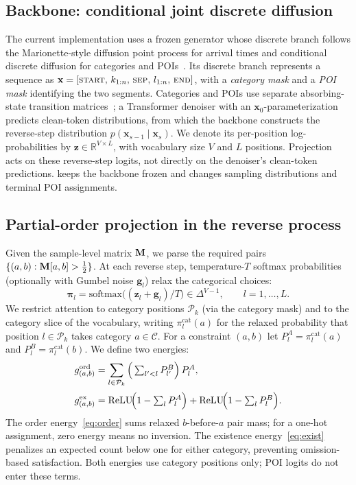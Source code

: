 \subsection{Backbone: conditional joint discrete diffusion}
\label{sec:method:backbone}
The current implementation uses a frozen generator whose discrete branch follows the Marionette-style diffusion point process for arrival times and conditional
discrete diffusion for categories and POIs~\cite{deng2025marionette}. Its discrete
branch represents a sequence as
$\mathbf{x}=[\textsc{start},\,k_{1:n},\,\textsc{sep},\,l_{1:n},\,\textsc{end}]$,
with a \emph{category mask} and a \emph{POI mask} identifying the two segments.
Categories and POIs use separate absorbing-state transition
matrices~\cite{austin2021d3pm}; a Transformer denoiser with an
$\mathbf{x}_0$-parameterization predicts clean-token distributions, from which
the backbone constructs the reverse-step distribution
$p(\mathbf{x}_{s-1}\!\mid\!\mathbf{x}_s)$.
We denote its per-position log-probabilities by
$\mathbf{z}\in\mathbb{R}^{V\times L}$, with vocabulary size $V$ and $L$ positions.
Projection acts on these reverse-step logits, not directly on the denoiser's
clean-token predictions. \pcdg keeps the backbone frozen and changes sampling
distributions and terminal POI assignments.

\subsection{Partial-order projection in the reverse process}
\label{sec:method:energy}
\label{sec:method:project}
\label{sec:method:placement}
Given the sample-level matrix $\mathbf{M}$, we parse the required pairs
$\{(a,b): \mathbf{M}[a,b]>\tfrac12\}$. At each reverse step, temperature-$T$
softmax probabilities (optionally with Gumbel noise $\mathbf{g}_l$) relax the
categorical choices:
\begin{equation}
  \boldsymbol{\pi}_l = \mathrm{softmax}\big((\mathbf{z}_l + \mathbf{g}_l)/T\big)\in\Delta^{V-1},
  \qquad l=1,\dots,L .
\end{equation}
We restrict attention to category positions $\mathcal{P}_k$ (via the category
mask) and to the category slice of the vocabulary, writing
$\pi^{\mathrm{cat}}_l(a)$ for the relaxed probability that position
$l\in\mathcal{P}_k$ takes category $a\in\mathcal{C}$. For a constraint $(a,b)$ let
$P^A_l=\pi^{\mathrm{cat}}_l(a)$ and $P^B_l=\pi^{\mathrm{cat}}_l(b)$. We define two
energies:
\begin{align}
  g^{\mathrm{ord}}_{(a,b)} &= \sum_{l\in\mathcal{P}_k}
     \Big(\textstyle\sum_{l'<l} P^B_{l'}\Big)\, P^A_l,
     \label{eq:order}\\[2pt]
  g^{\mathrm{ex}}_{(a,b)}  &= \mathrm{ReLU}\!\Big(1-\textstyle\sum_{l} P^A_l\Big)
                           + \mathrm{ReLU}\!\Big(1-\textstyle\sum_{l} P^B_l\Big).
     \label{eq:exist}
\end{align}
The order energy~\eqref{eq:order} sums relaxed $b$-before-$a$ pair mass; for a
one-hot assignment, zero energy means no inversion. The existence
energy~\eqref{eq:exist} penalizes an expected count below one for either
category, preventing omission-based satisfaction. Both energies use category
positions only; POI logits do not enter these terms.

